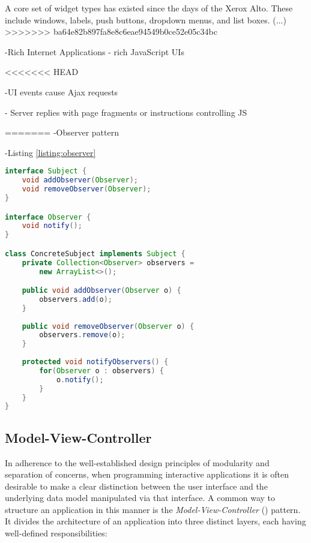 A core set of widget types has existed since the days of the Xerox Alto. These include windows, labels, push buttons, dropdown menus, and list boxes. (...)
>>>>>>> ba64e82b897fa8e8c6eae94549b0ce52e05c34bc


-Rich Internet Applications - rich JavaScript UIs

<<<<<<< HEAD


-UI events cause Ajax requests

- Server replies with page fragments or instructions controlling JS

=======
-Observer pattern \cite{GoF}

-Listing \ref{listing:observer}

\begin{code}
\begin{lstlisting}[language=Java,caption=An implementation of the observer pattern.\label{listing:observer}]
interface Subject {
    void addObserver(Observer);
    void removeObserver(Observer);
}

interface Observer {
    void notify();
}

class ConcreteSubject implements Subject {
    private Collection<Observer> observers = 
        new ArrayList<>();

    public void addObserver(Observer o) {
        observers.add(o);
    }
    
    public void removeObserver(Observer o) {
        observers.remove(o);
    }
    
    protected void notifyObservers() {
        for(Observer o : observers) {
            o.notify();
        }
    }
}


\end{lstlisting}
\end{code}

\subsection{Model-View-Controller}

In adherence to the well-established design principles of modularity and separation of concerns, when programming interactive applications it is often desirable to make a clear distinction between the user interface and the underlying data model manipulated via that interface. A common way to structure an application in this manner is the \emph{Model-View-Controller} () pattern. It divides the architecture of an application into three distinct layers, each having well-defined responsibilities:


